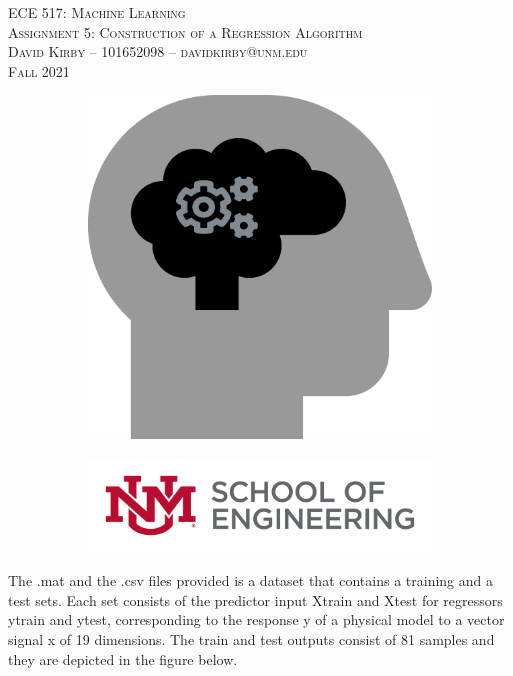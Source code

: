 \documentclass[11pt]{article}
\begin{document}
\setmainfont{SF Pro Text}
\setsansfont{SF Pro Text}
\setmonofont{SF Mono}
\renewcommand{\familydefault}{\sfdefault}

\thispagestyle{empty}
\begin{titlepage}
\vspace*{\fill}
\begin{center}
\textsc{\Huge{ECE 517: Machine Learning}}\\[3em]
\textsc{\LARGE Assignment 5: Construction of a Regression Algorithm}\\[6em]
\textsc{\Large David Kirby -- 101652098 -- davidkirby@unm.edu}\\[3em]
\textsc{\Large Fall 2021}
\end{center}
\vfill
\begin{figure}[h]
\begin{subfigure}{0.5\textwidth}
\includegraphics[width=0.25\linewidth]{learning.png}
\end{subfigure}
\begin{subfigure}{0.6\textwidth}\hspace{1em}
\includegraphics[width=0.8\linewidth]{new-soe-logo.png}
\end{subfigure}
\end{figure}
\end{titlepage}
\setcounter{figure}{0}

\hypersetup{
    linkcolor=CrispBlue,
    urlcolor=CrispBlue,
    breaklinks=true
}


The .mat and the .csv files provided is a dataset that contains a training and a test sets. Each set consists of the predictor input Xtrain and Xtest for regressors ytrain and ytest, corresponding to the response y of a physical model to a vector signal x of 19 dimensions. The train and test outputs consist of 81 samples and they are depicted in the figure below.
\end{document}
